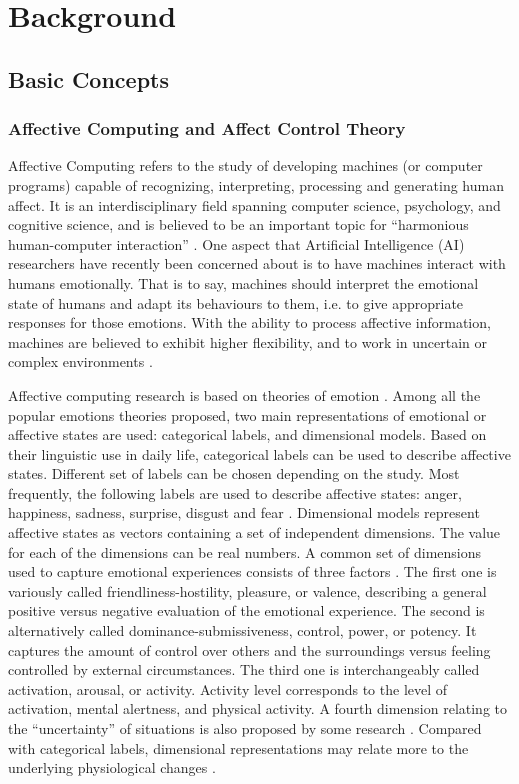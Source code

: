 \chapter{Background}
\label{chap:bg}

\section{Basic Concepts}
\label{sec:concepts}
\subsection{Affective Computing and Affect Control Theory}

Affective Computing refers to the study of developing machines (or computer programs) capable of recognizing, interpreting, processing and generating human affect. It is an interdisciplinary field spanning computer science, psychology, and cognitive science, and is believed to be an important topic for ``harmonious human-computer interaction'' \cite{tao2005affective}. One aspect that Artificial Intelligence (AI) researchers have recently been concerned about is to have machines interact with humans emotionally. That is to say, machines should interpret the emotional state of humans and adapt its behaviours to them, i.e. to give appropriate responses for those emotions. With the ability to process affective information, machines are believed to exhibit higher flexibility, and to work in uncertain or complex environments \cite{picard2000affective}.

Affective computing research is based on theories of emotion \cite{lewis2010handbook}. Among all the popular emotions theories proposed, two main representations of emotional or affective states are used: categorical labels, and dimensional models. Based on their linguistic use in daily life, categorical labels can be used to describe affective states. Different set of labels can be chosen depending on the study. Most frequently, the following labels are used to describe affective states: anger, happiness, sadness, surprise, disgust and fear \cite{ekman1992there}. Dimensional models represent affective states as vectors containing a set of independent dimensions. The value for each of the dimensions can be real numbers. A common set of dimensions used to capture emotional experiences consists of three factors \cite{scholl2013socio}. The first one is variously called friendliness-hostility, pleasure, or valence, describing a general positive versus negative evaluation of the emotional experience. The second is alternatively called dominance-submissiveness, control, power, or potency. It captures the amount of control over others and the surroundings versus feeling controlled by external circumstances. The third one is interchangeably called activation, arousal, or activity. Activity level corresponds to the level of activation, mental alertness, and physical activity. A fourth dimension relating to the ``uncertainty'' of situations is also proposed by some research \cite{fontaine2007world}.  Compared with categorical labels, dimensional representations may relate more to the underlying physiological changes \cite{mauss2009measures}.

